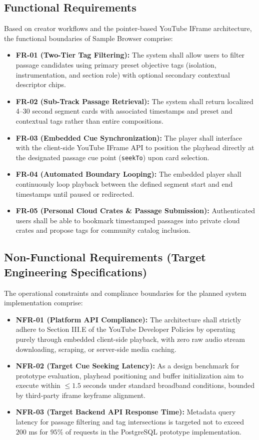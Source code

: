 \subsection{Functional Requirements}
Based on creator workflows and the pointer-based YouTube IFrame architecture, the functional boundaries of Sample Browser comprise:
\begin{itemize}
    \item \textbf{FR-01 (Two-Tier Tag Filtering):} The system shall allow users to filter passage candidates using primary preset objective tags (isolation, instrumentation, and section role) with optional secondary contextual descriptor chips.
    \item \textbf{FR-02 (Sub-Track Passage Retrieval):} The system shall return localized 4--30 second segment cards with associated timestamps and preset and contextual tags rather than entire compositions.
    \item \textbf{FR-03 (Embedded Cue Synchronization):} The player shall interface with the client-side YouTube IFrame API to position the playhead directly at the designated passage cue point (\texttt{seekTo}) upon card selection.
    \item \textbf{FR-04 (Automated Boundary Looping):} The embedded player shall continuously loop playback between the defined segment start and end timestamps until paused or redirected.
    \item \textbf{FR-05 (Personal Cloud Crates \& Passage Submission):} Authenticated users shall be able to bookmark timestamped passages into private cloud crates and propose tags for community catalog inclusion.
\end{itemize}

\subsection{Non-Functional Requirements (Target Engineering Specifications)}
The operational constraints and compliance boundaries for the planned system implementation comprise:
\begin{itemize}
    \item \textbf{NFR-01 (Platform API Compliance):} The architecture shall strictly adhere to Section III.E of the YouTube Developer Policies by operating purely through embedded client-side playback, with zero raw audio stream downloading, scraping, or server-side media caching.
    \item \textbf{NFR-02 (Target Cue Seeking Latency):} As a design benchmark for prototype evaluation, playhead positioning and buffer initialization aim to execute within $\le 1.5$ seconds under standard broadband conditions, bounded by third-party iframe keyframe alignment.
    \item \textbf{NFR-03 (Target Backend API Response Time):} Metadata query latency for passage filtering and tag intersections is targeted not to exceed $200$ ms for $95\%$ of requests in the PostgreSQL prototype implementation.
\end{itemize}

